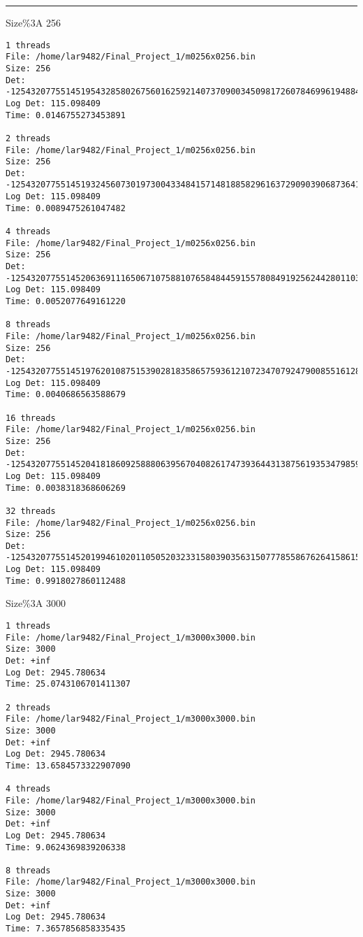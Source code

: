 \documentclass[letter, 12pt]{article}
\newenvironment{question}[1]{%
    \vspace{.2in}%
        \noindent{\bf #1}%
    \vspace{0.3em} \hrule \vspace{.1in}%
}{}
\begin{document}
\begin{question}{\large Appendix}
Size\%3A 256
\begin{lstlisting}[style=CStyle]
1 threads
File: /home/lar9482/Final_Project_1/m0256x0256.bin
Size: 256
Det: -12543207755145195432858026756016259214073709003450981726078469961948848037604112420866477611992185506862719903465472.000000
Log Det: 115.098409
Time: 0.0146755273453891

2 threads
File: /home/lar9482/Final_Project_1/m0256x0256.bin
Size: 256
Det: -12543207755145193245607301973004334841571481885829616372909039068736411611833506010913478412616262283349542880411648.000000
Log Det: 115.098409
Time: 0.0089475261047482

4 threads
File: /home/lar9482/Final_Project_1/m0256x0256.bin
Size: 256
Det: -12543207755145206369111650671075881076584844591557808491925624428011030166457144470631473608871801624428605018734592.000000
Log Det: 115.098409
Time: 0.0052077649161220

8 threads
File: /home/lar9482/Final_Project_1/m0256x0256.bin
Size: 256
Det: -12543207755145197620108751539028183586575936121072347079247900855161284463374718830819476811368108730375896926519296.000000
Log Det: 115.098409
Time: 0.0040686563588679

16 threads
File: /home/lar9482/Final_Project_1/m0256x0256.bin
Size: 256
Det: -12543207755145204181860925888063956704082617473936443138756193534798593740686538060678474409495878400915427995680768.000000
Log Det: 115.098409
Time: 0.0038318368606269

32 threads
File: /home/lar9482/Final_Project_1/m0256x0256.bin
Size: 256
Det: -12543207755145201994610201105052032331580390356315077785586762641586157314915931650725475210119955177402250972626944.000000
Log Det: 115.098409
Time: 0.9918027860112488
\end{lstlisting}

Size\%3A 3000
\begin{lstlisting}[style=CStyle]
1 threads
File: /home/lar9482/Final_Project_1/m3000x3000.bin
Size: 3000
Det: +inf
Log Det: 2945.780634
Time: 25.0743106701411307

2 threads
File: /home/lar9482/Final_Project_1/m3000x3000.bin
Size: 3000
Det: +inf
Log Det: 2945.780634
Time: 13.6584573322907090

4 threads
File: /home/lar9482/Final_Project_1/m3000x3000.bin
Size: 3000
Det: +inf
Log Det: 2945.780634
Time: 9.0624369839206338

8 threads
File: /home/lar9482/Final_Project_1/m3000x3000.bin
Size: 3000
Det: +inf
Log Det: 2945.780634
Time: 7.3657856858335435


\end{lstlisting}
\end{question}
\end{document}
